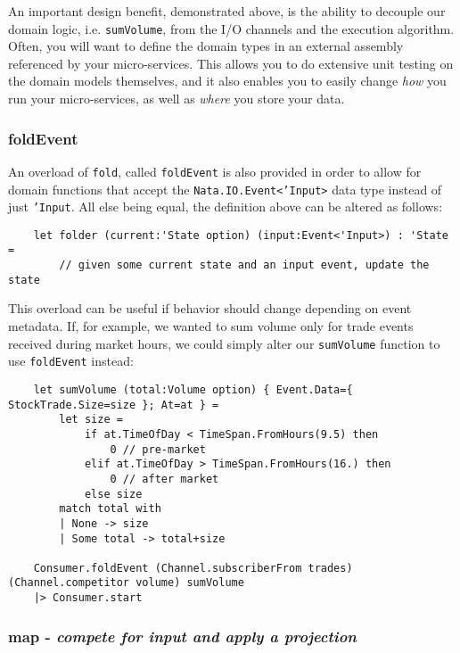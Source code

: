 \documentclass{article}
\begin{document}
An important design benefit, demonstrated above, is the ability to decouple our domain logic, i.e. \texttt{sumVolume}, from the I/O channels and the execution algorithm.  Often, you will want to define the domain types in an external assembly referenced by your micro-services.  This allows you to do extensive unit testing on the domain models themselves, and it also enables you to easily change \textit{how} you run your micro-services, as well as \textit{where} you store your data.

\subsubsection{foldEvent}

An overload of \texttt{fold}, called \texttt{foldEvent} is also provided in order to allow for domain functions that accept the \texttt{Nata.IO.Event<'Input>} data type instead of just \texttt{'Input}.  All else being equal, the definition above can be altered as follows:

\begin{verbatim}
    let folder (current:'State option) (input:Event<'Input>) : 'State =
        // given some current state and an input event, update the state
\end{verbatim}

This overload can be useful if behavior should change depending on event metadata.  If, for example, we wanted to sum volume only for trade events received during market hours, we could simply alter our \texttt{sumVolume} function to use \texttt{foldEvent} instead:

\begin{verbatim}
    let sumVolume (total:Volume option) { Event.Data={ StockTrade.Size=size }; At=at } =
        let size =
            if at.TimeOfDay < TimeSpan.FromHours(9.5) then
                0 // pre-market
            elif at.TimeOfDay > TimeSpan.FromHours(16.) then
                0 // after market
            else size
        match total with
        | None -> size
        | Some total -> total+size
        
    Consumer.foldEvent (Channel.subscriberFrom trades) (Channel.competitor volume) sumVolume
    |> Consumer.start
\end{verbatim}

\subsubsection{map - \textit{compete for input and apply a projection}}
\end{document}
